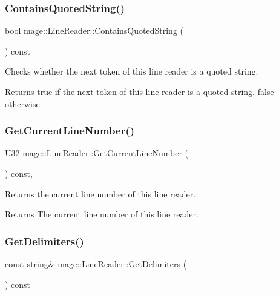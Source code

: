 \subsubsection{\texorpdfstring{Contains\+Quoted\+String()}{ContainsQuotedString()}}
{\footnotesize\ttfamily bool mage\+::\+Line\+Reader\+::\+Contains\+Quoted\+String (\begin{DoxyParamCaption}{ }\end{DoxyParamCaption}) const\hspace{0.3cm}{\ttfamily [protected]}}

Checks whether the next token of this line reader is a quoted string.

\begin{DoxyReturn}{Returns}
{\ttfamily true} if the next token of this line reader is a quoted string. {\ttfamily false} otherwise. 
\end{DoxyReturn}
\hypertarget{classmage_1_1_line_reader_aa0ed768e2799b74f2341c56fc6ac4969}{}\label{classmage_1_1_line_reader_aa0ed768e2799b74f2341c56fc6ac4969} 
\subsubsection{\texorpdfstring{Get\+Current\+Line\+Number()}{GetCurrentLineNumber()}}
{\footnotesize\ttfamily \hyperlink{namespacemage_a41c104c036fba3756a74e19f793eeaa1}{U32} mage\+::\+Line\+Reader\+::\+Get\+Current\+Line\+Number (\begin{DoxyParamCaption}{ }\end{DoxyParamCaption}) const\hspace{0.3cm}{\ttfamily [protected]}, {\ttfamily [noexcept]}}

Returns the current line number of this line reader.

\begin{DoxyReturn}{Returns}
The current line number of this line reader. 
\end{DoxyReturn}
\hypertarget{classmage_1_1_line_reader_aa00e1e27b614e11ec9f70e52d0bac551}{}\label{classmage_1_1_line_reader_aa00e1e27b614e11ec9f70e52d0bac551} 
\subsubsection{\texorpdfstring{Get\+Delimiters()}{GetDelimiters()}}
{\footnotesize\ttfamily const string\& mage\+::\+Line\+Reader\+::\+Get\+Delimiters (\begin{DoxyParamCaption}{ }\end{DoxyParamCaption}) const\hspace{0.3cm}{\ttfamily [noexcept]}}

